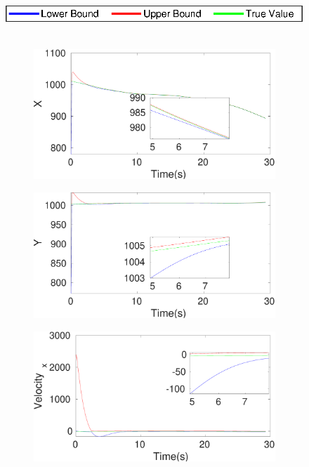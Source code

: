 \begin{figure}[h]
\hspace*{\fill} \includegraphics[scale=0.8]{figures/legend}\\\\
\begin{subfigure}{.5\linewidth}
\centering
\includegraphics[width=\linewidth]{figures/Prad/s3pmpradX}
\end{subfigure}
\begin{subfigure}{.5\linewidth}
\centering
\includegraphics[width=\linewidth]{figures/Prad/s3pmpradY}
\end{subfigure}
\begin{subfigure}{.5\linewidth}
\centering
\includegraphics[width=\linewidth]{figures/Prad/s3pmpradVelocity_x}

\end{subfigure}
\end{figure}
